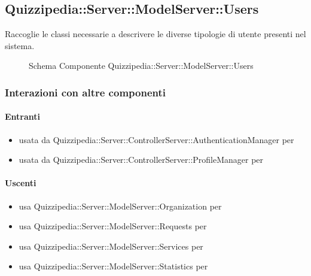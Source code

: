 \subsection{Quizzipedia::Server::ModelServer::Users}
Raccoglie le classi necessarie a descrivere le diverse tipologie di utente presenti nel sistema.
\begin{figure}[H]
\centering
\noindent{}
\caption[Schema Componente Quizzipedia::Server::ModelServer::Users]{Schema Componente Quizzipedia::Server::ModelServer::Users}
\end{figure}
\subsubsection{Interazioni con altre componenti}
\paragraph{Entranti}
\begin{itemize}
\item usata da Quizzipedia::Server::ControllerServer::AuthenticationManager per 
\item usata da Quizzipedia::Server::ControllerServer::ProfileManager per 
\end{itemize}
\paragraph{Uscenti}
\begin{itemize}
\item usa Quizzipedia::Server::ModelServer::Organization per 
\item usa Quizzipedia::Server::ModelServer::Requests per 
\item usa Quizzipedia::Server::ModelServer::Services per 
\item usa Quizzipedia::Server::ModelServer::Statistics per 
\end{itemize}
